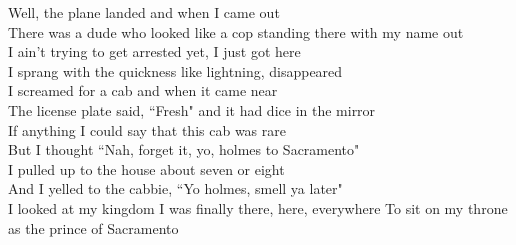 \documentclass{article}
\begin{document}
Well, the plane landed and when I came out \\
There was a dude who looked like a cop standing there with my name out \\
I ain't trying to get arrested yet, I just got here \\
I sprang with the quickness like lightning, disappeared \\

I screamed for a cab and when it came near \\
The license plate said, ``Fresh" and it had dice in the mirror \\
If anything I could say that this cab was rare \\
But I thought ``Nah, forget it, yo, holmes to Sacramento" \\

I pulled up to the house about seven or eight \\
And I yelled to the cabbie, ``Yo holmes, smell ya later" \\
I looked at my kingdom
I was finally there, here, everywhere
To sit on my throne as the prince of Sacramento
\end{document}
